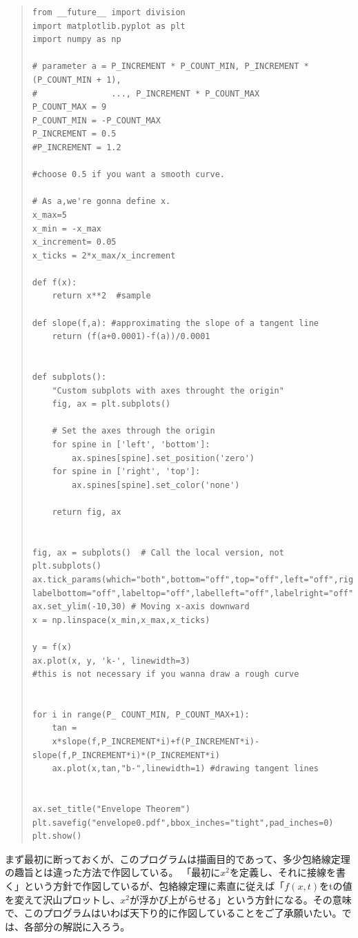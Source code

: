 \documentclass[11pt,a4j,fleqn]{jarticle}
\begin{document}
\begin{quote}
\begin{verbatim}
from __future__ import division
import matplotlib.pyplot as plt
import numpy as np

# parameter a = P_INCREMENT * P_COUNT_MIN, P_INCREMENT * (P_COUNT_MIN + 1),
#               ..., P_INCREMENT * P_COUNT_MAX
P_COUNT_MAX = 9
P_COUNT_MIN = -P_COUNT_MAX
P_INCREMENT = 0.5
#P_INCREMENT = 1.2

#choose 0.5 if you want a smooth curve.

# As a,we're gonna define x. 
x_max=5
x_min = -x_max
x_increment= 0.05
x_ticks = 2*x_max/x_increment

def f(x):
	return x**2  #sample

def slope(f,a): #approximating the slope of a tangent line
	return (f(a+0.0001)-f(a))/0.0001


def subplots():
    "Custom subplots with axes throught the origin"
    fig, ax = plt.subplots()

    # Set the axes through the origin
    for spine in ['left', 'bottom']:
        ax.spines[spine].set_position('zero')
    for spine in ['right', 'top']:
        ax.spines[spine].set_color('none')

    return fig, ax


fig, ax = subplots()  # Call the local version, not plt.subplots()
ax.tick_params(which="both",bottom="off",top="off",left="off",right="off",
labelbottom="off",labeltop="off",labelleft="off",labelright="off")
ax.set_ylim(-10,30) # Moving x-axis downward 
x = np.linspace(x_min,x_max,x_ticks)

y = f(x)
ax.plot(x, y, 'k-', linewidth=3)
#this is not necessary if you wanna draw a rough curve


for i in range(P_ COUNT_MIN, P_COUNT_MAX+1):
	tan = 
	x*slope(f,P_INCREMENT*i)+f(P_INCREMENT*i)-slope(f,P_INCREMENT*i)*(P_INCREMENT*i)
	ax.plot(x,tan,"b-",linewidth=1) #drawing tangent lines


ax.set_title("Envelope Theorem")
plt.savefig("envelope0.pdf",bbox_inches="tight",pad_inches=0)
plt.show()
\end{verbatim}
\end{quote}


まず最初に断っておくが、このプログラムは描画目的であって、多少包絡線定理の趣旨とは違った方法で作図している。
「最初に$x^2$を定義し、それに接線を書く」という方針で作図しているが、包絡線定理に素直に従えば「$f(x,t)$をtの値を変えて沢山プロットし、$x^2$が浮かび上がらせる」という方針になる。その意味で、このプログラムはいわば天下り的に作図していることをご了承願いたい。では、各部分の解説に入ろう。\\
\end{document}
